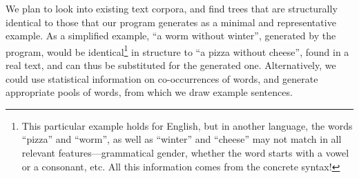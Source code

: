 We plan to look into existing text corpora, and find trees that are
structurally identical  to those that our program generates as a
minimal and representative example. As a simplified example, ``a worm
without winter'', generated by the program, would be identical\footnote{This particular example holds for English, but in another language, the words ``pizza'' and ``worm'', as well as ``winter'' and ``cheese'' may not match in all relevant features---grammatical gender, whether the word starts with a vowel or a consonant, etc. All this information comes from the concrete syntax!} 
in structure to ``a pizza without cheese'', found in a real text, and
can thus be substituted for the generated one.   
Alternatively, we could use statistical information on co-occurrences
of words, and generate appropriate pools of words, from which we draw
example sentences. 
